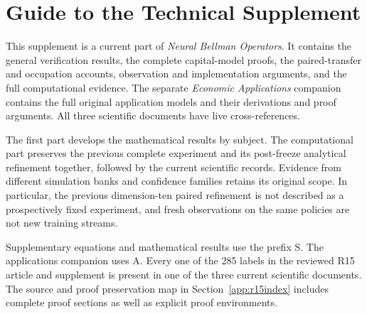 \section*{Guide to the Technical Supplement}
This supplement is a current part of \emph{Neural Bellman Operators}. It contains the general verification results, the complete capital-model proofs, the paired-transfer and occupation accounts, observation and implementation arguments, and the full computational evidence. The separate \emph{Economic Applications} companion contains the full original application models and their derivations and proof arguments. All three scientific documents have live cross-references.

The first part develops the mathematical results by subject. The computational part preserves the previous complete experiment and its post-freeze analytical refinement together, followed by the current scientific records. Evidence from different simulation banks and confidence families retains its original scope. In particular, the previous dimension-ten paired refinement is not described as a prospectively fixed experiment, and fresh observations on the same policies are not new training streams.

Supplementary equations and mathematical results use the prefix S. The applications companion uses A. Every one of the 285 labels in the reviewed R15 article and supplement is present in one of the three current scientific documents. The source and proof preservation map in Section~\ref{app:r15index} includes complete proof sections as well as explicit proof environments.
